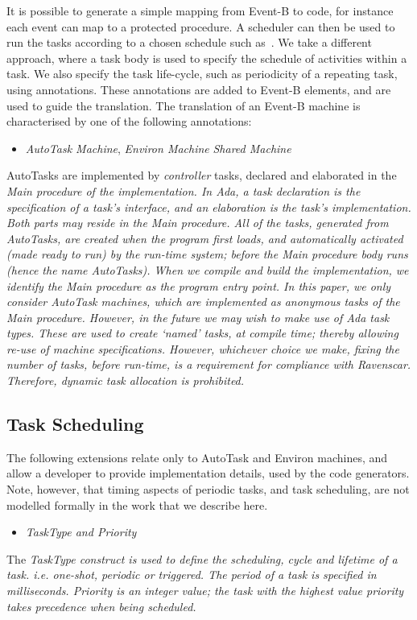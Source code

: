It is possible to generate a simple mapping from Event-B to code, for instance each event can map to a protected procedure. A scheduler can then be used to run the tasks according to a chosen schedule such as~\cite{StoddartCZ07}. We take a different approach, where a task body is used to specify the schedule of activities within a task. We also specify the task life-cycle, such as periodicity of a repeating task, using annotations. These annotations are added to Event-B elements, and are used to guide the translation. The translation of an Event-B machine is characterised by one of the following annotations:
\begin{itemize}
\item  \emph{AutoTask Machine}, \emph{Environ Machine} \emph{Shared Machine}
\end{itemize}
%
AutoTasks are implemented by \emph{controller} tasks, declared and elaborated in the \it Main \rm procedure of the implementation. In Ada, a task declaration is the specification of a task's interface, and an elaboration is the task's implementation. Both parts may reside in the \emph{Main} procedure. All of the tasks, generated from AutoTasks, are created when the program first loads, and automatically activated (made ready to run) by the run-time system; before the \it Main \rm procedure body runs (hence the name AutoTasks). When we compile and build the implementation, we identify the \emph{Main} procedure as the program entry point. In this paper, we only consider AutoTask machines, which are implemented as anonymous tasks of the \emph{Main} procedure. However, in the future we may wish to make use of Ada task types. These are used to create `named' tasks, at compile time; thereby allowing re-use of machine specifications. However, whichever choice we make, fixing the number of tasks, before run-time, is a requirement for compliance with Ravenscar. Therefore, dynamic task allocation is prohibited.
\subsection{Task Scheduling}
The following extensions relate only to AutoTask and Environ machines, and allow a developer to provide implementation details, used by the code generators. Note, however, that timing aspects of periodic tasks, and task scheduling, are not modelled formally in the work that we describe here. 
\begin{itemize}
\item \it TaskType \rm and \it Priority \rm 
\end{itemize}
The \it TaskType \rm construct is used to define the scheduling, cycle and lifetime of a task. i.e. one-shot, periodic or triggered. The period of a task is specified in milliseconds. \it Priority \rm is an integer value; the task with the highest value priority takes precedence when being scheduled. 
